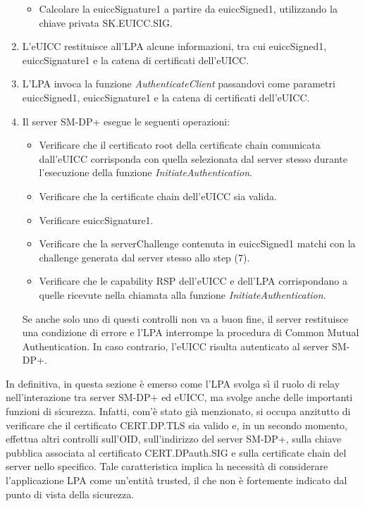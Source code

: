\documentclass[10pt, twoside, openany]{book}
\begin{document}
\begin{enumerate}
\begin{itemize}[itemsep=0pt]
\item Calcolare la euiccSignature1 a partire da euiccSigned1, utilizzando la chiave privata SK.EUICC.SIG.
\end{itemize}
\item L'eUICC restituisce all'LPA alcune informazioni, tra cui euiccSigned1, euiccSignature1 e la catena di certificati dell'eUICC.
\item L'LPA invoca la funzione \textit{AuthenticateClient} passandovi come parametri euiccSigned1, euiccSignature1 e la catena di certificati dell'eUICC.
\item Il server SM-DP+ esegue le seguenti operazioni:
\begin{itemize}[itemsep=0pt]
\item Verificare che il certificato root della certificate chain comunicata dall'eUICC corrisponda con quella selezionata dal server stesso durante l'esecuzione della funzione \textit{InitiateAuthentication}.
\item Verificare che la certificate chain dell'eUICC sia valida.
\item Verificare euiccSignature1.
\item Verificare che la serverChallenge contenuta in euiccSigned1 matchi con la challenge generata dal server stesso allo step (7).
\item Verificare che le capability RSP dell'eUICC e dell'LPA corrispondano a quelle ricevute nella chiamata alla funzione \textit{InitiateAuthentication}.
\end{itemize}
Se anche solo uno di questi controlli non va a buon fine, il server restituisce una condizione di errore e l'LPA interrompe la procedura di Common Mutual Authentication. In caso contrario, l'eUICC risulta autenticato al server SM-DP+.
\end{enumerate}
In definitiva, in questa sezione è emerso come l'LPA svolga sì il ruolo di relay nell'interazione tra server SM-DP+ ed eUICC, ma svolge anche delle importanti funzioni di sicurezza. Infatti, com'è stato già menzionato, si occupa anzitutto di verificare che il certificato CERT.DP.TLS sia valido e, in un secondo momento, effettua altri controlli sull'OID, sull'indirizzo del server SM-DP+, sulla chiave pubblica associata al certificato CERT.DPauth.SIG e sulla certificate chain del server nello specifico. Tale caratteristica implica la necessità di considerare l'applicazione LPA come un'entità trusted, il che non è fortemente indicato dal punto di vista della sicurezza.
\end{document}
